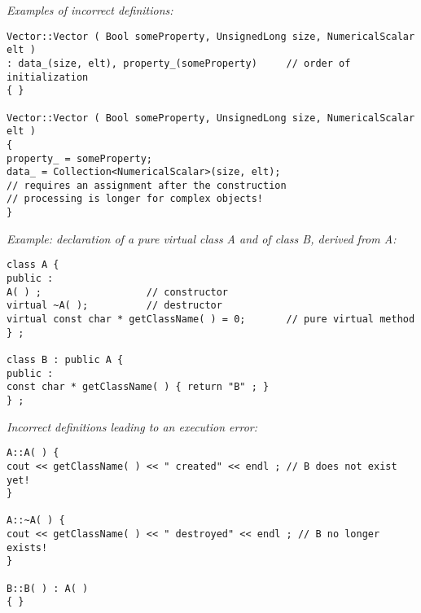 \emph{Examples of incorrect definitions:}
\begin{lstlisting}[frame=TBRL]
Vector::Vector ( Bool someProperty, UnsignedLong size, NumericalScalar elt )
: data_(size, elt), property_(someProperty)     // order of initialization
{ }

Vector::Vector ( Bool someProperty, UnsignedLong size, NumericalScalar elt )
{
property_ = someProperty;
data_ = Collection<NumericalScalar>(size, elt);
// requires an assignment after the construction
// processing is longer for complex objects!
}
\end{lstlisting}


\emph{Example: declaration of a pure virtual class A and of class B, derived from A:}
\begin{lstlisting}[frame=TBRL]
class A {
public :
A( ) ;                  // constructor
virtual ~A( );          // destructor
virtual const char * getClassName( ) = 0;       // pure virtual method
} ;

class B : public A {
public :
const char * getClassName( ) { return "B" ; }
} ;
\end{lstlisting}

\emph{Incorrect definitions leading to an execution error:}
\begin{lstlisting}[frame=TBRL]
A::A( ) {
cout << getClassName( ) << " created" << endl ; // B does not exist yet!
}

A::~A( ) {
cout << getClassName( ) << " destroyed" << endl ; // B no longer exists!
}

B::B( ) : A( )
{ }
\end{lstlisting}


